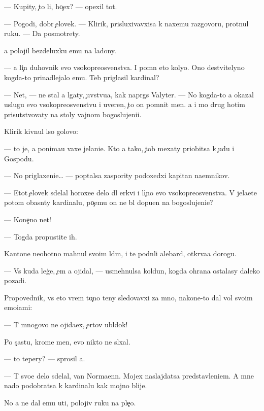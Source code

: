 \documentclass[10pt]{book}
\begin{document}
— Kupity, {\c}to li, ho{\c}ex? — opexil tot.

— Pogodi, dobr{\yi}{\y} {\c}elovek. — Klirik, prisluxivavxi{\y}sa k naxemu razgovoru, prot{\ia}nul ruku. — Da{\y} posmotrety.

{\Y}a polojil bezdeluxku {\y}emu na ladony.

— {\Y}a li{\c}n{\yi}{\y} duhovnik {\y}evo v{\yi}sokopreosv{\ia}{\x}enstva. I pomn{\iu} eto koly{\q}o. Ono de{\y}stvitelyno kogda-to prinadlejalo {\y}emu. Teb{\ia} priglasil kardinal?

— Net, — ne stal {\y}a lgaty, {\c}uvstvu{\y}a, kak napr{\ia}gs{\ia} Valyter. — No kogda-to {\y}a okazal uslugu {\y}evo v{\yi}sokopreosv{\ia}{\x}enstvu i uveren, {\c}to on pomnit men{\ia}. {\Y}a i mo{\y} drug hotim prisutstvovaty na stoly vajnom bogoslujeni{\y}i.

Klirik kivnul l{\yi}so{\y} golovo{\y}:

— {\C}to je, {\y}a ponima{\y}u vaxe jelani{\y}e. Kto {\y}a tako{\y}, {\c}tob{\yi} mexaty priob{\x}itsa k {\c}udu i Gospodu.

— No priglaxeni{\y}e… — pop{\yi}talsa zaspority podoxedxi{\y} kapitan na{\y}emnikov.

— Etot {\c}elovek sdelal horoxe{\y}e delo dl{\ia} {\Q}erkvi i li{\c}no {\y}evo v{\yi}sokopreosv{\ia}{\x}enstva. V{\yi} jela{\y}ete potom ob{\y}asn{\ia}ty kardinalu, po{\c}emu on ne b{\yi}l dopu{\x}en na bogoslujeni{\y}e?

— Kone{\c}no net!

— Togda propustite ih.

Kantone{\q} neohotno mahnul svo{\y}im l{\iu}d{\ia}m, i te podn{\ia}li alebard{\yi}, otkr{\yi}va{\y}a dorogu.

— Vs{\e} kuda leg{\c}e, {\c}em {\y}a ojidal, — usmehnulsa koldun, kogda ohrana ostalasy daleko pozadi.

Propovednik, vs{\e} eto vrem{\ia} to{\c}no teny sledovavxi{\y} za mno{\y}, nakone{\q}-to dal vol{\iu} svo{\y}im emo{\q}i{\y}ami:

— T{\yi} mnogovo ne ojida{\y}ex, {\c}ertov ubl{\iu}dok!

Po s{\c}ast{\y}u, krome men{\ia}, {\y}evo nikto ne sl{\yi}xal.

— {\C}to tepery? — sprosil {\y}a.

— T{\yi} svo{\y}e delo sdelal, van Norma{\y}enn. Mojex naslajdatsa predstavleni{\y}em. A mne nado podobratsa k kardinalu kak mojno blije.

No {\y}a ne dal {\y}emu u{\y}ti, polojiv ruku na ple{\c}o.
\end{document}
